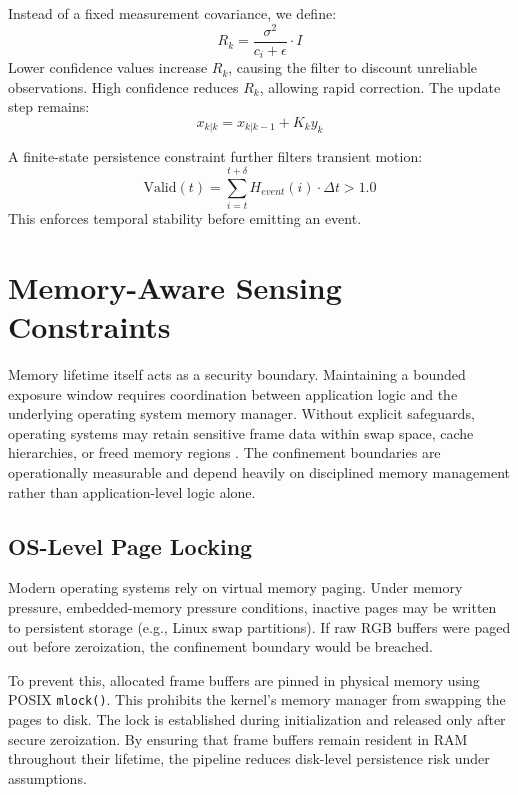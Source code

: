\documentclass[conference]{IEEEtran}
\begin{document}
Instead of a fixed measurement covariance, we define:
\begin{equation}
R_k = \frac{\sigma^2}{c_i + \epsilon} \cdot I
\end{equation}
Lower confidence values increase $R_k$, causing the filter to discount unreliable observations. High confidence reduces $R_k$, allowing rapid correction. The update step remains:
\begin{equation}
x_{k|k} = x_{k|k-1} + K_k y_k
\end{equation}

A finite-state persistence constraint further filters transient motion:
\begin{equation}
\text{Valid}(t) = \sum_{i=t}^{t+\delta} H_{event}(i) \cdot \Delta t > 1.0
\end{equation}
This enforces temporal stability before emitting an event.

\section{Memory-Aware Sensing Constraints}

Memory lifetime itself acts as a security boundary. Maintaining a bounded exposure window requires coordination between application logic and the underlying operating system memory manager. Without explicit safeguards, operating systems may retain sensitive frame data within swap space, cache hierarchies, or freed memory regions \cite{b21, b22}. The confinement boundaries are operationally measurable and depend heavily on disciplined memory management rather than application-level logic alone.

\subsection{OS-Level Page Locking}
Modern operating systems rely on virtual memory paging. Under memory pressure, embedded-memory pressure conditions, inactive pages may be written to persistent storage (e.g., Linux swap partitions). If raw RGB buffers were paged out before zeroization, the confinement boundary would be breached.

To prevent this, allocated frame buffers are pinned in physical memory using POSIX \texttt{mlock()}. This prohibits the kernel’s memory manager from swapping the pages to disk. The lock is established during initialization and released only after secure zeroization. By ensuring that frame buffers remain resident in RAM throughout their lifetime, the pipeline reduces disk-level persistence risk under assumptions.
\end{document}
